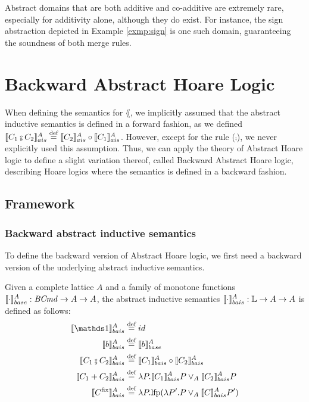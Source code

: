 \documentclass[
  10pt,       %
  twoside,    %
  a4paper,    %
  english,    %
  tikz,       %
  openright,  %
]{book}
\begin{document}
Abstract domains that are both additive and co-additive are extremely rare,
especially for additivity alone, although they do exist. For instance, the
sign abstraction  depicted in Example \ref{exmp:sign} is one such domain,
guaranteeing the soundness of both merge rules.

\chapter{Backward Abstract Hoare Logic}

When defining the semantics for $\lang$, we implicitly assumed that the
abstract inductive semantics is defined in a forward fashion, as we defined $\asem{C_1
\fcmp C_2} \defeq \asem{C_2} \circ \asem{C_1}$. However, except for the rule
($\fcmp$), we never explicitly used this assumption. Thus, we can apply the theory of
Abstract Hoare logic to define a slight variation thereof, called Backward Abstract
Hoare logic, describing Hoare logics where the semantics is defined in a 
backward fashion. 

\section{Framework}

\subsection{Backward abstract inductive semantics}

To define the backward version of Abstract Hoare logic, we first need a
backward version of the underlying abstract inductive semantics.

\begin{definition}
  Given a complete lattice $A$ and a family of monotone functions $\llbracket \cdot \rrbracket_{base}^A :
  \mathit{BCmd} \to A \to A$, the abstract inductive semantics $\llbracket \cdot \rrbracket_{bais}^{A}: \mathbb{L} \to A \to A$
 is defined as
  follows:
%
  \begin{align*}
            \asemback{\sskip}        &\defeq id \\
      \asemback{b}             &\defeq \bsem{b}^A \\
      \asemback{C_1 \fcmp C_2} &\defeq \asemback{C_1} \circ \asemback{C_2} \\
      \asemback{C_1 + C_2}     &\defeq \lambda P . \asemback{C_1} P \join_A \asemback{C_2} P \\
      \asemback{C^\fix}        &\defeq \lambda P . \lfp(\lambda P'. P \join_A \asemback{C} P')
  \end{align*}
\end{definition}
\end{document}

